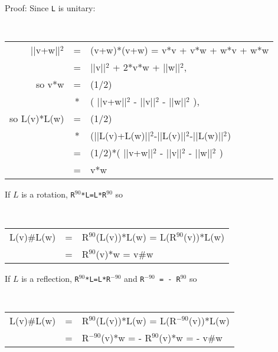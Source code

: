 \documentclass[12pt]{article}
\begin{document}
\begin{indpar}{0.3in}
Proof: Since {\tt L} is unitary: \\
{\small \tt
\hspace*{0.05in}
       \begin{tabular}[t]{rcl}
       ||v+w||$^2$ & = & (v+w)*(v+w) = v*v + v*w + w*v + w*w \\
		   & = & ||v||$^2$ + 2*v*w + ||w||$^2${\rm ,} \\
       {\rm so} v*w & = & (1/2) \\
                    & * & ( ||v+w||$^2$ - ||v||$^2$ - ||w||$^2$ ){\rm ,} \\
       {\rm so} L(v)*L(w)
         & = & (1/2) \\
	 & * & (||L(v)+L(w)||$^2$-||L(v)||$^2$-||L(w)||$^2$) \\
         & = & (1/2)*( ||v+w||$^2$ - ||v||$^2$ - ||w||$^2$ ) \\
         & = & v*w
       \end{tabular}
} %

If $L$ is a rotation, {\tt R$^{90}$*L=L*R$^{90}$} so \\
{\tt
\hspace*{0.1in}
       \begin{tabular}[t]{rcl}
       L(v)\#L(w) & = & R$^{90}$(L(v))*L(w) = L(R$^{90}$(v))*L(w) \\
                  & = & R$^{90}$(v)*w = v\#w \\
       \end{tabular}
} %

If $L$ is a reflection, {\tt R$^{90}$*L=L*R$^{-90}$}
and {\tt R$^{-90}$ = - R$^{90}$} so \\
{\tt
\hspace*{0.1in}
       \begin{tabular}[t]{rcl}
       L(v)\#L(w) & = & R$^{90}$(L(v))*L(w) = L(R$^{-90}$(v))*L(w) \\
                  & = & R$^{-90}$(v)*w = - R$^{90}$(v)*w = - v\#w
       \end{tabular}
} %
\end{indpar}


\bigskip
\end{document}
